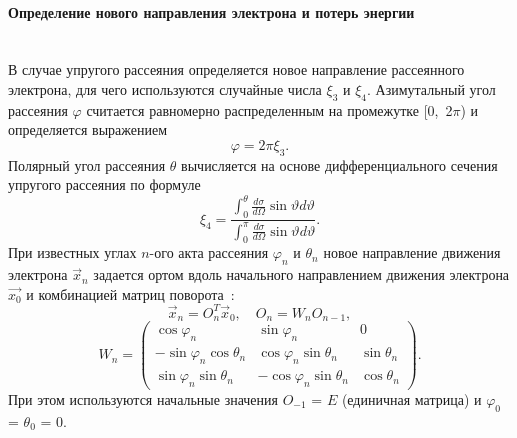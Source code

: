 \paragraph{Определение нового направления электрона и потерь энергии} \mbox{} \\
\indent В случае упругого рассеяния определяется новое направление рассеянного электрона, для чего используются случайные числа $\xi_3$ и $\xi_4$. Азимутальный угол рассеяния $\varphi$ считается равномерно распределенным на промежутке [0,~2$\pi$) и определяется выражением
\begin{equation} \label{eq:MC_11}
	\varphi = 2 \pi \xi_3.
\end{equation}
Полярный угол рассеяния $\theta$ вычисляется на основе дифференциального сечения упругого рассеяния по формуле
\begin{equation} \label{eq:MC_12}
	\xi_4 = \frac
	{\displaystyle \int_0^\theta \frac{d \sigma}{d \Omega} \sin \vartheta d \vartheta}
	{\displaystyle \int_0^\pi \frac{d \sigma}{d \Omega} \sin \vartheta d \vartheta}.
\end{equation}
При известных углах $n$-ого акта рассеяния $\varphi_n$ и $\theta_n$ новое направление движения электрона $\vec{x}_n$ задается ортом вдоль начального направлением движения электрона $\vec{x_0}$ и комбинацией матриц поворота~\cite{rotation_matrices}:
\begin{equation} \label{eq:MC_13}
	\vec{x}_n=O_n^T \vec{x}_0, \quad O_n=W_n O_{n-1},
\end{equation}
\begin{equation} \label{eq:MC_14}
	W_n=\left(\begin{array}{ccc}
		\cos \varphi_n & \sin \varphi_n & 0 \\
		-\sin \varphi_n \cos \theta_n & \cos \varphi_n \sin \theta_n & \sin \theta_n \\
		\sin \varphi_n \sin \theta_n & -\cos \varphi_n \sin \theta_n & \cos \theta_n
	\end{array}\right).
\end{equation}
При этом используются начальные значения $O_{-1}$ = $E$ (единичная матрица) и $\varphi_0$ = $\theta_0$ = 0.

